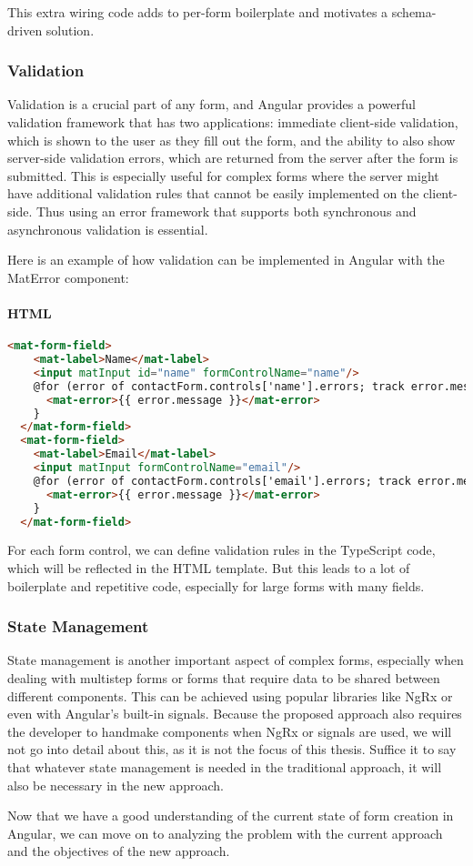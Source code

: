 This extra wiring code adds to per-form boilerplate and motivates a schema-driven solution.

\subsubsection{Validation}

Validation is a crucial part of any form, and Angular provides a powerful validation framework that has two applications:
immediate client-side validation, which is shown to the user as they fill out the form, and the ability to also show
server-side validation errors, which are returned from the server after the form is submitted.
This is especially useful for complex forms where the server might have additional validation rules that cannot be easily
implemented on the client-side.
Thus using an error framework that supports both synchronous and asynchronous validation is essential.

Here is an example of how validation can be implemented in Angular with the MatError component:

\paragraph{HTML}
\begin{lstlisting}[language=HTML]
  <mat-form-field>
    <mat-label>Name</mat-label>
    <input matInput id="name" formControlName="name"/>
    @for (error of contactForm.controls['name'].errors; track error.message) {
      <mat-error>{{ error.message }}</mat-error>
    }
  </mat-form-field>
  <mat-form-field>
    <mat-label>Email</mat-label>
    <input matInput formControlName="email"/>
    @for (error of contactForm.controls['email'].errors; track error.message) {
      <mat-error>{{ error.message }}</mat-error>
    }
  </mat-form-field>
\end{lstlisting}

For each form control, we can define validation rules in the TypeScript code, which will be reflected in the HTML template.
But this leads to a lot of boilerplate and repetitive code, especially for large forms with many fields.

\subsubsection{State Management}

State management is another important aspect of complex forms, especially when dealing with multistep forms or forms
that require data to be shared between different components.
This can be achieved using popular libraries like NgRx or even with Angular's built-in signals.
Because the proposed approach also requires the developer to handmake components when NgRx or signals are used,
we will not go into detail about this, as it is not the focus of this thesis.
Suffice it to say that whatever state management is needed in the traditional approach, it will also be necessary in the
new approach.

Now that we have a good understanding of the current state of form creation in Angular, we can move on to analyzing the
problem with the current approach and the objectives of the new approach.